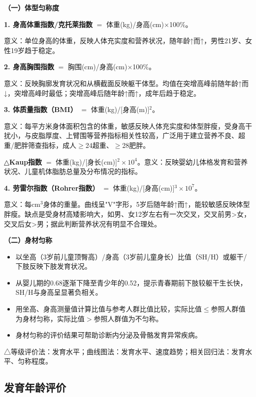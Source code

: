 \begin{keybox}
\textbf{（一）体型匀称度}

\textbf{1. 身高体重指数/克托莱指数} $=$ 体重(kg)/身高(cm)$\times$100\%。

意义：单位身高的体重，反映人体充实度和营养状况，随年龄↑而↑，男性21岁、女性19岁趋于稳定。

\textbf{2. 身高胸围指数} $=$ 胸围(cm)/身高(cm)$\times$100\%。

意义：反映胸廓发育状况和从横截面反映躯干体型。均值在突增高峰前随年龄↑而↓，突增高峰时最低；突增高峰后随年龄↑而↑，成年后趋于稳定。

\textbf{3. 体质量指数（BMI）} $=$ 体重(kg)/[身高(m)]$^2$。

意义：每平方米身体面积包含的体重，敏感反映人体充实度和体型胖瘦，受身高干扰小，与皮脂厚度、上臂围等营养指标相关性较高，广泛用于建立营养不良、超重/肥胖筛查指标，成人$\geq$24超重、$\geq$28肥胖。

△\textbf{Kaup指数} $=$ 体重(kg)/[身长(cm)]$^2\times 10^4$。意义：反映婴幼儿体格发育和营养状况、儿童机体脂肪总量及分布情况的指标。

\textbf{4. 劳雷尔指数（Rohrer指数）} $=$ 体重(kg)/[身高(cm)]$^3\times 10^7$。

意义：每cm$^3$身体的重量。曲线呈"V"字形，5岁后随年龄↑而↑，能较敏感反映体型胖瘦。缺点是受身材高矮影响大，如男、女12岁左右有一次交叉，交叉前男>女，交叉后女>男；据此判断营养状况有明显不合理处。

\textbf{（二）身材匀称}

\begin{itemize}[leftmargin=*]
    \item 以坐高（3岁前儿童顶臀高）/身高（3岁前儿童身长）比值（SH/H）或躯干/下肢反映下肢发育状况。
    \item 从婴儿期的0.68逐渐下降至青少年的0.52，提示青春期前下肢较躯干生长快，SH/H与身高呈显著负相关。
    \item 用坐高、身高测量值计算比值与参考人群比值比较，实际比值$\leq$参照人群值为身材匀称，实际比值$>$参照人群值为不匀称。
    \item 身材匀称的评价结果可帮助诊断内分泌及骨骼发育异常疾病。
\end{itemize}

△等级评价法：发育水平；曲线图法：发育水平、速度趋势；相关回归法：发育水平、匀称程度。
\end{keybox}

\subsection{发育年龄评价}

